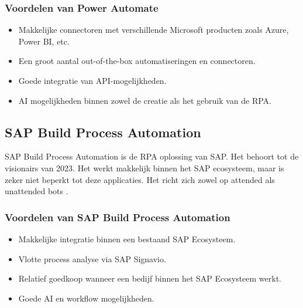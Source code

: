 \subsubsection{Voordelen van Power Automate}

\begin{itemize}
    \item Makkelijke connectoren met verschillende Microsoft producten zoals Azure, Power BI, etc.
    \item Een groot aantal out-of-the-box automatiseringen en connectoren.
    \item Goede integratie van API-mogelijkheden.
    \item AI mogelijkheden binnen zowel de creatie als het gebruik van de RPA.
\end{itemize}

\subsection{SAP Build Process Automation}

SAP Build Process Automation is de RPA oplossing van SAP. Het behoort tot de visionairs van 2023. Het werkt makkelijk binnen het SAP ecosysteem, maar is zeker niet beperkt tot deze applicaties. Het richt zich zowel op attended als unattended bots \autocite{GartnerSAPBPA2023}.

\subsubsection{Voordelen van SAP Build Process Automation}

\begin{itemize}
    \item Makkelijke integratie binnen een bestaand SAP Ecosysteem.
    \item Vlotte process analyse via SAP Signavio.
    \item Relatief goedkoop wanneer een bedijf binnen het SAP Ecosysteem werkt.
    \item Goede AI en workflow mogelijkheden.
\end{itemize}